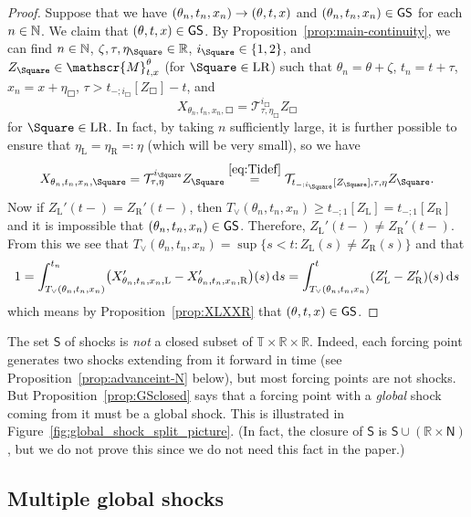 \documentclass[AHL,Unicode,longabstracts]{cedram}
\newcommand*\ssS{\mathsf{S}}
\newcommand*\GS{\mathsf{GS}}
\newcommand*\ssN{\mathsf{N}}
\newcommand*\scM{\mathscr{M}}
\newcommand*\TT{\mathbb{T}}
\newcommand*\RR{\mathbb{R}}
\newcommand*\NN{\mathbb{N}}
\newcommand{\clT}{\mathcal{T}}
\newcommand*\st{\mathrel{:}}
\newcommand*\dif{\mathrm{d}}
\newcommand*\Left{\mathrm{L}}
\newcommand*\Right{\mathrm{R}}
\newcommand*\LR{\mathrm{LR}}
\renewcommand*{\to}{\mathchoice{\longrightarrow}{\rightarrow}{\rightarrow}{\rightarrow}}
\let\oldin\in
\renewcommand{\in}{\mathchoice{\oldin}{\oldin}{\,\oldin\,}{\,\oldin\,}}
\let\originalleft\left
\let\originalright\right
\renewcommand{\left}{\mathopen{}\mathclose\bgroup\originalleft}
\renewcommand{\right}{\aftergroup\egroup\originalright}
\newcommand*\TT{\mathbb{T}}
\newcommand*\RR{\mathbb{R}}
\begin{document}
\begin{proof}
Suppose that we have $(\theta_{n},t_{n},x_{n})\to(\theta,t,x)$ and $(\theta_{n},t_{n},x_{n})\in\GS$ for each $n\in\NN$. We claim that $(\theta,t,x)\in\GS$. By Proposition~\ref{prop:main-continuity}, we can find $n\in\NN$, $\zeta,\tau,\eta_{\Square}\in\RR$, $i_{\Square}\in\{1,2\}$, and $Z_{\Square}\in\scM_{t,x}^{\theta}$ (for $\Square\in\LR$) such that $\theta_{n}=\theta+\zeta$, $t_{n}=t+\tau$, $x_{n}=x+\eta_{\Square}$, $\tau>t_{-;i_{\Square}}[Z_{\Square}]-t$, and
\[
X_{\theta_{n},t_{n},x_{n},\Square}=\clT_{\tau,\eta_{\Square}}^{i_{\Square}}Z_{\Square}
\]
for $\Square\in\LR$. In fact, by taking $n$ sufficiently large, it is further possible to ensure that $\eta_{\Left}=\eta_{\Right}\eqqcolon\eta$ (which will be very small), so we have
\[
X_{\theta_{n},t_{n},x_{n},\Square}=\clT_{\tau,\eta}^{i_{\Square}}Z_{\Square}\overset{\eqref{eq:Tidef}}{=}\clT_{t_{-;i_{\Square}}\left[Z_{\Square}\right],\tau,\eta}Z_{\Square}.
\]
Now if $Z_{\Left}'(t-)=Z_{\Right}'(t-)$, then $T_{\vee}(\theta_{n},t_{n},x_{n})\ge t_{-;1}[Z_{\Left}]=t_{-;1}[Z_{\Right}]$ and it is impossible that $(\theta_{n},t_{n},x_{n})\in\GS$. Therefore, $Z_{\Left}'(t-)\ne Z_{\Right}'(t-)$. From this we see that $T_{\vee}(\theta_{n},t_{n},x_{n})=\sup\{s<t\st Z_{\Left}(s)\ne Z_{\Right}(s)\}$ and that
\[
1=\int_{T_{\vee}(\theta_{n},t_{n},x_{n})}^{t_{n}}\left(X_{\theta_{n},t_{n},x_{n},\Left}'-X_{\theta_{n},t_{n},x_{n},\Right}'\right)(s)\,\dif s=\int_{T_{\vee}(\theta_{n},t_{n},x_{n})}^{t}\left(Z_{\Left}'-Z_{\Right}'\right)(s)\,\dif s
\]
which means by Proposition~\ref{prop:XLXXR} that $(\theta,t,x)\in\GS$.
\end{proof}


\begin{rema}
The set $\ssS$ of shocks is \emph{not} a closed subset of $\TT\times\RR\times\RR$. Indeed, each forcing point generates two shocks extending from it forward in time (see Proposition~\ref{prop:advanceint-N} below), but most forcing points are not shocks. But Proposition~\ref{prop:GSclosed} says that a forcing point with a \emph{global} shock coming from it must be a global shock. This is illustrated in Figure~\ref{fig:global_shock_split_picture}. (In fact, the closure of $\ssS$ is $\ssS\cup(\RR\times\ssN)$, but we do not prove this since we do not need this fact in the paper.)
\end{rema}


\subsection{Multiple global shocks}
\end{document}
